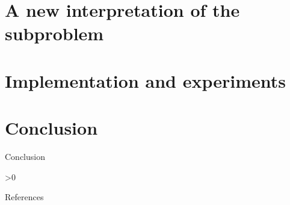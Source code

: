 \documentclass[
]{talk}
\begin{document}
\section{A new interpretation of the subproblem}

\section{Implementation and experiments}

\section{Conclusion}

\begin{frame}{Conclusion}
\end{frame}


\appendix
\ifnum\value{cite}>0
    \begin{frame}[t,allowframebreaks]{References}
        
        
    \end{frame}
\fi
\end{document}
